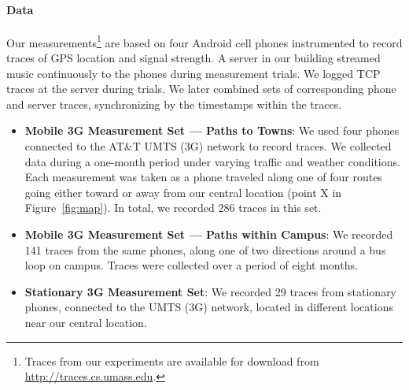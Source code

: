 \paragraph*{Data}
Our measurements\footnote{Traces from our experiments are available for download from \url{http://traces.cs.umass.edu}.}
are based on four Android cell phones instrumented to record traces of GPS location and 
signal strength. %
A server in our building streamed music 
continuously to the phones during measurement trials. We logged TCP traces at the server during trials. We later combined sets of corresponding phone and server traces, synchronizing by the timestamps within the traces. 

\begin{itemize}
	\item {\bf Mobile 3G Measurement Set --- Paths to Towns}: We used four phones connected to the AT\&T UMTS (3G)
	network to record traces. We collected data during a
	one-month period under varying traffic and weather conditions. Each
	measurement was taken as a phone traveled along one of four routes
	going either toward or away from our central location (point X in
	Figure~\ref{fig:map}). In total, we recorded 286 traces in
	this set.
	\item {\bf Mobile 3G Measurement Set --- Paths within Campus}: We
	recorded 141 traces from the same phones, along one of two
	directions around a bus loop on campus. Traces were collected over a
	period of eight months.
	\item {\bf Stationary 3G Measurement Set}: We recorded 29 traces from
	stationary phones, connected to the UMTS (3G) network, located in
	different locations near our central location.
\end{itemize}

